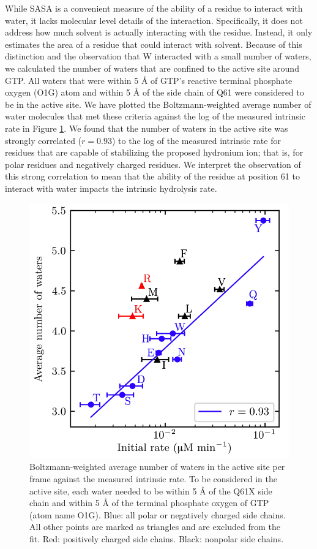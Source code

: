 While SASA is a convenient measure of the ability of a residue to interact with water, it lacks molecular level details of the interaction. 
Specifically, it does not address how much solvent is actually interacting with the residue. 
Instead, it only estimates the area of a residue that could interact with solvent. 
Because of this distinction and the observation that W interacted with a small number of waters, we calculated the number of waters that are confined to the active site around GTP. 
All waters that were within 5 \si{\angstrom} of GTP's reactive terminal phosphate oxygen (O1G) atom and within 5 \si{\angstrom} of the side chain of Q61 were considered to be in the active site. 
We have plotted the Boltzmann-weighted average number of water molecules that met these criteria against the log of the measured intrinsic rate in Figure \ref{fig:ras-scount}. 
We found that the number of waters in the active site was strongly correlated ($r = 0.93$) to the log of the measured intrinsic rate for residues that are capable of stabilizing the proposed hydronium ion; that is, for polar residues and negatively charged residues. 
We interpret the observation of this strong correlation to mean that the ability of the residue at position 61 to interact with water impacts the intrinsic hydrolysis rate.

\begin{figure}
    \center
    \includegraphics[width=\single]{figures-ras/Figure6.png}
    \caption{
        Boltzmann-weighted average number of waters in the active site per frame against the measured intrinsic rate. 
        To be considered in the active site, each water needed to be within 5 \si{\angstrom} of the Q61X side chain and within 5 \si{\angstrom} of the terminal phosphate oxygen of GTP (atom name O1G). 
        Blue: all polar or negatively charged side chains. 
        All other points are marked as triangles and are excluded from the fit. 
        Red: positively charged side chains. 
        Black: nonpolar side chains.
    }
    \label{fig:ras-scount}
\end{figure}

